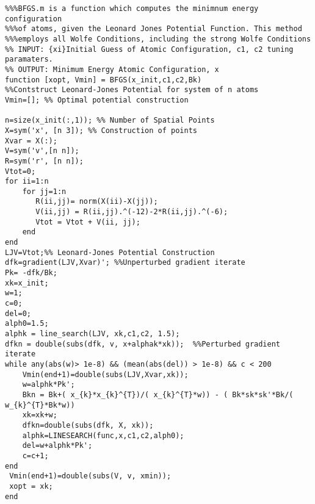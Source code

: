 \documentclass{article}
\begin{document}
\begin{lstlisting}
%%%BFGS.m is a function which computes the minimnum energy configuration
%%%of atoms, given the Leonard Jones Potential Function. This method
%%%employs all Wolfe Conditions, including the strong Wolfe Conditions 
%% INPUT: {xi}Initial Guess of Atomic Configuration, c1, c2 tuning paramaters. 
%% OUTPUT: Minimum Energy Atomic Configuration, x
function [xopt, Vmin] = BFGS(x_init,c1,c2,Bk) 
%%Contstruct Leonard-Jones Potential for system of n atoms
Vmin=[]; %% Optimal potential construction 

n=size(x_init(:,1)); %% Number of Spatial Points 
X=sym('x', [n 3]); %% Construction of points 
Xvar = X(:); 
V=sym('v',[n n]); 
R=sym('r', [n n]);
Vtot=0; 
for ii=1:n 
    for jj=1:n  
       R(ii,jj)= norm(X(ii)-X(jj)); 
       V(ii,jj) = R(ii,jj).^(-12)-2*R(ii,jj).^(-6); 
       Vtot = Vtot + V(ii, jj);       
    end 
end 
LJV=Vtot;%% Leonard-Jones Potential Construction 
dfk=gradient(LJV,Xvar)'; %%Unperturbed gradient iterate
Pk= -dfk/Bk; 
xk=x_init;  
w=1; 
c=0; 
del=0;
alph0=1.5; 
alphk = line_search(LJV, xk,c1,c2, 1.5);
dfkn = double(subs(dfk, v, x+alphak*xk));  %%Perturbed gradient iterate
while any(abs(w)> 1e-8) && (mean(abs(del)) > 1e-8) && c < 200
    Vmin(end+1)=double(subs(LJV,Xvar,xk)); 
    w=alphk*Pk'; 
    Bkn = Bk+( x_{k}*x_{k}^{T})/( x_{k}^{T}*w)) - ( Bk*sk*sk'*Bk/( w_{k}^{T}*Bk*w))
    xk=xk+w; 
    dfkn=double(subs(dfk, X, xk));
    alphk=LINESEARCH(func,x,c1,c2,alph0); 
    del=w+alphk*Pk'; 
    c=c+1; 
end
 Vmin(end+1)=double(subs(V, v, xmin));
 xopt = xk; 
end

\end{lstlisting}
\end{document}
